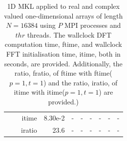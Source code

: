 \documentclass[a4paper]{article}
\begin{document}
\begin{table}[htbp]
\begin{center}
\begin{small}
\begin{tabular}{|r|r|r|r|r|r|r|r|r|r|}
           &          & itime &   8.30e-2 &  - &  - &  - &  - &  - &  - \\
           &          & iratio &   23.6 &  - &  - &  - &  - &  - &  - \\\hline
\end{tabular}
\caption{1D MKL applied to real and complex valued one-dimensional arrays of length $N=16384$ using $P$ MPI processes and $thr$ threads. The wallclock DFT computation time, ftime, and wallclock FFT initialisation time, itime, both in seconds, are provided. Additionally, the ratio, fratio, of ftime  with ftime($p=1,t=1$) and the ratio, iratio, of itime  with itime($p=1,t=1$) are provided.) }\label{Tbl:MKL1d16384}
\end{small}
\end{center}
\end{table}
\end{document}
